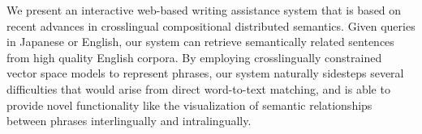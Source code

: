 We present an interactive web-based writing assistance system that is based on recent advances in crosslingual compositional distributed semantics. Given queries in Japanese or English, our system can retrieve semantically related sentences from high quality English corpora. By employing crosslingually constrained vector space models to represent phrases, our system naturally sidesteps several difficulties that would arise from direct word-to-text matching, and is able to provide novel functionality like the visualization of semantic relationships between phrases interlingually and intralingually.

